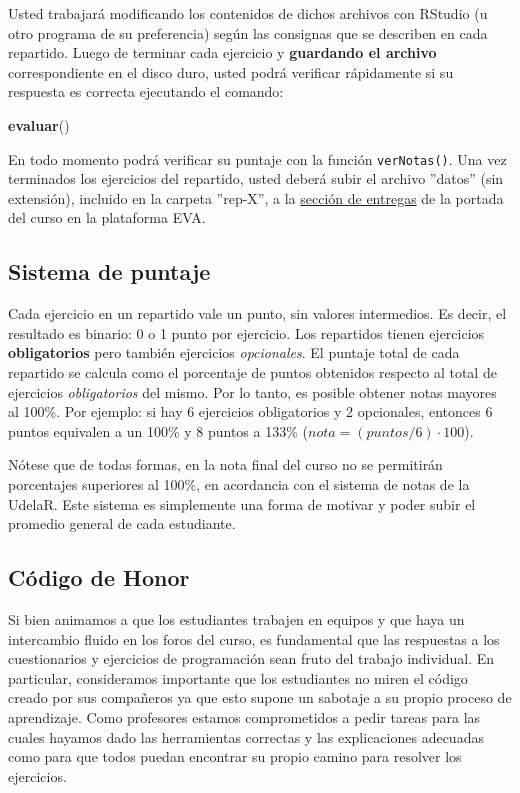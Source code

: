 \documentclass[]{article}
\newenvironment{Shaded}{}{}
\newcommand{\KeywordTok}[1]{\textcolor[rgb]{0.00,0.44,0.13}{\textbf{{#1}}}}
\newcommand{\NormalTok}[1]{{#1}}
\begin{document}
Usted trabajará modificando los contenidos de dichos archivos con
RStudio (u otro programa de su preferencia) según las consignas que se
describen en cada repartido. Luego de terminar cada ejercicio y
\textbf{guardando el archivo} correspondiente en el disco duro, usted
podrá verificar rápidamente si su respuesta es correcta ejecutando el
comando:

\begin{Shaded}
\begin{Highlighting}[]
\KeywordTok{evaluar}\NormalTok{()}
\end{Highlighting}
\end{Shaded}
En todo momento podrá verificar su puntaje con la función
\texttt{verNotas()}. Una vez terminados los ejercicios del repartido,
usted deberá subir el archivo ''datos'' (sin extensión), incluido en la
carpeta ''rep-X'', a la
\href{http://eva.universidad.edu.uy/mod/assignment/view.php?id=93616}{sección
de entregas} de la portada del curso en la plataforma EVA.

\subsection{Sistema de puntaje}

Cada ejercicio en un repartido vale un punto, sin valores intermedios.
Es decir, el resultado es binario: 0 o 1 punto por ejercicio. Los
repartidos tienen ejercicios \textbf{obligatorios} pero también
ejercicios \emph{opcionales}. El puntaje total de cada repartido se
calcula como el porcentaje de puntos obtenidos respecto al total de
ejercicios \emph{obligatorios} del mismo. Por lo tanto, es posible
obtener notas mayores al 100\%. Por ejemplo: si hay 6 ejercicios
obligatorios y 2 opcionales, entonces 6 puntos equivalen a un 100\% y 8
puntos a 133\% ($nota = (puntos / 6) \cdot 100$).

Nótese que de todas formas, en la nota final del curso no se permitirán
porcentajes superiores al 100\%, en acordancia con el sistema de notas
de la UdelaR. Este sistema es simplemente una forma de motivar y poder
subir el promedio general de cada estudiante.

\subsection{Código de Honor}

Si bien animamos a que los estudiantes trabajen en equipos y que haya un
intercambio fluido en los foros del curso, es fundamental que las
respuestas a los cuestionarios y ejercicios de programación sean fruto
del trabajo individual. En particular, consideramos importante que los
estudiantes no miren el código creado por sus compañeros ya que esto
supone un sabotaje a su propio proceso de aprendizaje. Como profesores
estamos comprometidos a pedir tareas para las cuales hayamos dado las
herramientas correctas y las explicaciones adecuadas como para que todos
puedan encontrar su propio camino para resolver los ejercicios.
\end{document}
